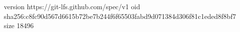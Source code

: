 version https://git-lfs.github.com/spec/v1
oid sha256:c8fc90d567d6615b72be7b244f6f65503fabd9d071384d306f81c1eded8f8bf7
size 18496
